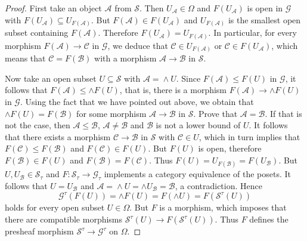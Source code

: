 \documentclass[12pt]{amsart}%
\theoremstyle{plain}
\numberwithin{equation}{section}
\numberwithin{equation}{section}
\numberwithin{theorem}{section}
\numberwithin{lemma}{section}
\numberwithin{remark}{section}
\numberwithin{example}{section}
\numberwithin{proposition}{section}
\numberwithin{definition}{section}
\numberwithin{corollary}{section}
\begin{document}
\begin{proof}
First take an object $\mathcal{A}$ from $\mathcal{S}$. Then $U_{\mathcal{A}%
}\in\Omega$ and $F\left(  U_{\mathcal{A}}\right)  $ is open in $\mathcal{G}$
with $F\left(  U_{\mathcal{A}}\right)  \subseteq U_{F\left(  \mathcal{A}%
\right)  }$. But $F\left(  \mathcal{A}\right)  \in F\left(  U_{\mathcal{A}%
}\right)  $ and $U_{F\left(  \mathcal{A}\right)  }$ is the smallest open
subset containing $F\left(  \mathcal{A}\right)  $. Therefore $F\left(
U_{\mathcal{A}}\right)  =U_{F\left(  \mathcal{A}\right)  }$. In particular,
for every morphism $F\left(  \mathcal{A}\right)  \rightarrow\mathcal{C}$ in
$\mathcal{G}$, we deduce that $\mathcal{C\in}U_{F\left(  \mathcal{A}\right)
}$ or $\mathcal{C\in}F\left(  U_{\mathcal{A}}\right)  $, which means that
$\mathcal{C=}F\left(  \mathcal{B}\right)  $ with a morphism
$\mathcal{A\rightarrow B}$ in $\mathcal{S}$.

Now take an open subset $U\subseteq\mathcal{S}$ with $\mathcal{A=}\wedge U$.
Since $F\left(  \mathcal{A}\right)  \leq F\left(  U\right)  $ in $\mathcal{G}%
$, it follows that $F\left(  \mathcal{A}\right)  \leq\wedge F\left(  U\right)
$, that is, there is a morphism $F\left(  \mathcal{A}\right)  \rightarrow
\wedge F\left(  U\right)  $ in $\mathcal{G}$. Using the fact that we have
pointed out above, we obtain that $\wedge F\left(  U\right)  =F\left(
\mathcal{B}\right)  $ for some morphism $\mathcal{A\rightarrow B}$ in
$\mathcal{S}$. Prove that $\mathcal{A=B}$. If that is not the case, then
$\mathcal{A\leq B}$, $\mathcal{A\neq B}$ and $\mathcal{B}$ is not a lower
bound of $U$. It follows that there exists a morphism $\mathcal{C\rightarrow
B}$ in $\mathcal{S}$ with $\mathcal{C\in}U$, which in turn implies that
$F\left(  \mathcal{C}\right)  \leq F\left(  \mathcal{B}\right)  $ and
$F\left(  \mathcal{C}\right)  \in F\left(  U\right)  $. But $F\left(
U\right)  $ is open, therefore $F\left(  \mathcal{B}\right)  \in F\left(
U\right)  $ and $F\left(  \mathcal{B}\right)  =F\left(  \mathcal{C}\right)  $.
Thus $F\left(  U\right)  =U_{F\left(  \mathcal{B}\right)  }=F\left(
U_{\mathcal{B}}\right)  $. But $U,U_{\mathcal{B}}\in\mathcal{S}_{\tau}$ and
$F:\mathcal{S}_{\tau}\rightarrow\mathcal{G}_{\tau}$ implements a category
equivalence of the posets. It follows that $U=U_{\mathcal{B}}$ and
$\mathcal{A=}\wedge U=\wedge U_{\mathcal{B}}=\mathcal{B}$, a contradiction.
Hence
\[
\mathcal{G}^{\tau}\left(  F\left(  U\right)  \right)  =\wedge F\left(
U\right)  =F\left(  \wedge U\right)  =F\left(  \mathcal{S}^{\tau}\left(
U\right)  \right)
\]
holds for every open subset $U\in\Omega$. But $F$ is a morphism, which imposes
that there are compatible morphisms $\mathcal{S}^{\tau}\left(  U\right)
\rightarrow F\left(  \mathcal{S}^{\tau}\left(  U\right)  \right)  $. Thus $F$
defines the presheaf morphism $\mathcal{S}^{\tau}\rightarrow\mathcal{G}^{\tau
}$ on $\Omega$.
\end{proof}
\end{document}
